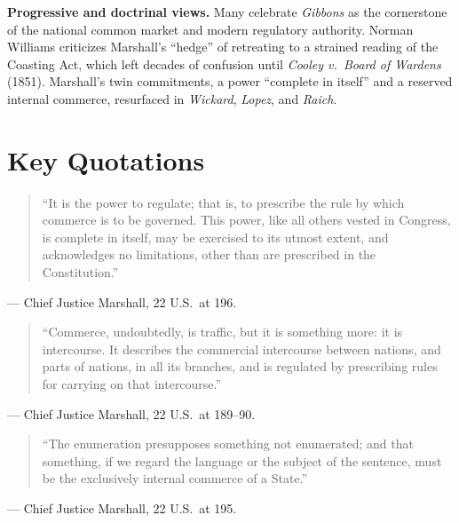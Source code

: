 \documentclass[12pt]{article}
\begin{document}
\textbf{Progressive and doctrinal views.} Many celebrate \textit{Gibbons} as the cornerstone of the national common market and modern regulatory authority. Norman Williams criticizes Marshall's ``hedge'' of retreating to a strained reading of the Coasting Act, which left decades of confusion until \textit{Cooley v.\ Board of Wardens} (1851). Marshall's twin commitments, a power ``complete in itself'' and a reserved internal commerce, resurfaced in \textit{Wickard}, \textit{Lopez}, and \textit{Raich}.

\section{Key Quotations}

\begin{quote}
``It is the power to regulate; that is, to prescribe the rule by which commerce is to be governed. This power, like all others vested in Congress, is complete in itself, may be exercised to its utmost extent, and acknowledges no limitations, other than are prescribed in the Constitution.''
\end{quote}
\noindent --- Chief Justice Marshall, 22 U.S.\ at 196.

\begin{quote}
``Commerce, undoubtedly, is traffic, but it is something more: it is intercourse. It describes the commercial intercourse between nations, and parts of nations, in all its branches, and is regulated by prescribing rules for carrying on that intercourse.''
\end{quote}
\noindent --- Chief Justice Marshall, 22 U.S.\ at 189--90.

\begin{quote}
``The enumeration presupposes something not enumerated; and that something, if we regard the language or the subject of the sentence, must be the exclusively internal commerce of a State.''
\end{quote}
\noindent --- Chief Justice Marshall, 22 U.S.\ at 195.
\end{document}
